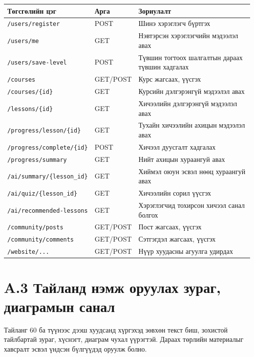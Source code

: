 \begin{longtable}{|p{5.2cm}|p{2.3cm}|p{7.3cm}|}
\hline
\textbf{Төгсгөлийн цэг} & \textbf{Арга} & \textbf{Зориулалт} \\
\hline
\texttt{/users/register} & POST & Шинэ хэрэглэгч бүртгэх \\
\hline
\texttt{/users/me} & GET & Нэвтэрсэн хэрэглэгчийн мэдээлэл авах \\
\hline
\texttt{/users/save-level} & POST & Түвшин тогтоох шалгалтын дараах түвшин хадгалах \\
\hline
\texttt{/courses} & GET/POST & Курс жагсаах, үүсгэх \\
\hline
\texttt{/courses/\{id\}} & GET & Курсийн дэлгэрэнгүй мэдээлэл авах \\
\hline
\texttt{/lessons/\{id\}} & GET & Хичээлийн дэлгэрэнгүй мэдээлэл авах \\
\hline
\texttt{/progress/lesson/\{id\}} & GET & Тухайн хичээлийн ахицын мэдээлэл авах \\
\hline
\texttt{/progress/complete/\{id\}} & POST & Хичээл дуусгалт хадгалах \\
\hline
\texttt{/progress/summary} & GET & Нийт ахицын хураангуй авах \\
\hline
\texttt{/ai/summary/\{lesson\_id\}} & GET & Хиймэл оюун эсвэл нөөц хураангуй авах \\
\hline
\texttt{/ai/quiz/\{lesson\_id\}} & GET & Хичээлийн сорил үүсгэх \\
\hline
\texttt{/ai/recommended-lessons} & GET & Хэрэглэгчид тохирсон хичээл санал болгох \\
\hline
\texttt{/community/posts} & GET/POST & Пост жагсаах, үүсгэх \\
\hline
\texttt{/community/comments} & GET/POST & Сэтгэгдэл жагсаах, үүсгэх \\
\hline
\texttt{/website/...} & GET/POST & Нүүр хуудасны агуулга удирдах \\
\hline
\end{longtable}

\section*{A.3 Тайланд нэмж оруулах зураг, диаграмын санал}
Тайланг 60 ба түүнээс дээш хуудсанд хүргэхэд зөвхөн текст биш, зохистой тайлбартай зураг, хүснэгт, диаграм чухал үүрэгтэй. Дараах төрлийн материалыг хавсралт эсвэл үндсэн бүлгүүдэд оруулж болно.

